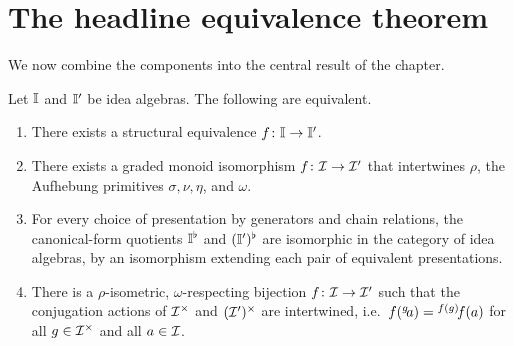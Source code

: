 \section{The headline equivalence theorem}\label{sec:equiv-thm}

We now combine the components into the central result of the chapter.

\begin{theorem}\label{thm:struct-equiv}
Let $\mathbb{I}$ and $\mathbb{I}'$ be idea algebras. The following are
equivalent.
\begin{enumerate}
  \item There exists a structural equivalence $f\colon\mathbb{I}\to
        \mathbb{I}'$.
  \item There exists a graded monoid isomorphism $f\colon\mathcal{I}\to
        \mathcal{I}'$ that intertwines $\rho$, the Aufhebung primitives
        $\sigma,\nu,\eta$, and $\omega$.
  \item For every choice of presentation by generators and chain
        relations, the canonical-form quotients $\mathbb{I}^{\flat}$ and
        $(\mathbb{I}')^{\flat}$ are isomorphic in the category of
        idea algebras, by an isomorphism extending each pair of
        equivalent presentations.
  \item There is a $\rho$-isometric, $\omega$-respecting bijection
        $f\colon\mathcal{I}\to\mathcal{I}'$ such that the conjugation actions of
        $\mathcal{I}^{\times}$ and $(\mathcal{I}')^{\times}$ are intertwined,
        i.e.\ $f({}^{g}\!a) = {}^{f(g)}\!f(a)$ for all
        $g\in\mathcal{I}^{\times}$ and all $a\in\mathcal{I}$.
\end{enumerate}
\end{theorem}

